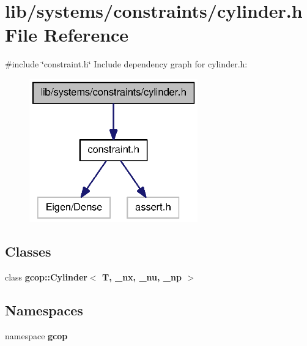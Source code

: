 \section{lib/systems/constraints/cylinder.h \-File \-Reference}
\label{cylinder_8h}
{\ttfamily \#include \char`\"{}constraint.\-h\char`\"{}}\*
\-Include dependency graph for cylinder.\-h\-:\nopagebreak
\begin{figure}[H]
\begin{center}
\leavevmode
\includegraphics[width=206pt]{cylinder_8h__incl}
\end{center}
\end{figure}
\subsection*{\-Classes}
\begin{DoxyCompactItemize}
\item 
class {\bf gcop\-::\-Cylinder$<$ T, \-\_\-nx, \-\_\-nu, \-\_\-np $>$}
\end{DoxyCompactItemize}
\subsection*{\-Namespaces}
\begin{DoxyCompactItemize}
\item 
namespace {\bf gcop}
\end{DoxyCompactItemize}
